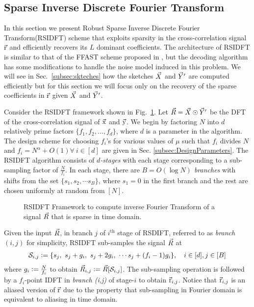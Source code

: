 \subsection{Sparse Inverse Discrete Fourier Transform}
\label{subsec:RSIDFT}	
 In this section we present Robust Sparse Inverse Discrete Fourier Transform(RSIDFT) scheme that exploits sparsity in the cross-correlation signal $\vec{\mathrm{r}}$ and efficiently recovers its $L$ dominant coefficients. The architecture of RSIDFT is similar to that of the FFAST scheme proposed in \cite{pawar2014robust}, but the decoding algorithm has some modifications to handle the noise model induced in this problem. We will see in Sec.~\ref{subsec:skteches} how the sketches $\vec{X}$ and $\vec{Y}'$ are computed efficiently but for this section we will focus only on the recovery of the sparse coefficients in $\vec{\mathrm{r}}$ given $\vec{X}$ and $\vec{Y}'$.
	  	
Consider the RSIDFT framework shown in Fig.~\ref{fig:rsidft}. Let $ \vec{R} =\vec{X} \odot \vec{Y}'$ be the DFT of the cross-correlation signal of $\vec{\mathrm{x}}$ and $\vec{\mathrm{y}}$. We begin by factoring $N$ into $d$ relatively prime factors $\{f_1,f_2,\ldots,f_d\}$, where $d$ is a parameter in the algorithm. The design scheme for choosing $f_i$'s for various values of $\mu$ such that $f_i$ divides $N$ and $f_i=N^{\alpha}+O(1) \forall ~i\in[d]$ are given in Sec. \ref{subsec:DesignParameters}. The RSIDFT algorithm consists of {\it $d$-stages} with each stage corresponding to a sub-sampling factor of $\frac{N}{f_i}$. In each stage, there are {\it $B= O(\log N)$ branches} with shifts from the set $ \{s_1, s_2, \cdots s_B\} $, where $s_1 =0$ in the first branch and the rest are chosen uniformly at random from $[N]$.
	   	 	
\begin{figure}[h!]
	\begin{center}
	 	\resizebox{0.43\textwidth}{!}{}
	\end{center}	
\caption{ RSIDFT Framework to compute inverse Fourier Transform of a signal $\vec{R}$ that is sparse in time domain. }\label{fig:rsidft}
\end{figure}

	 Given the input $\vec{R}$, in branch $j$ of $i^{\text{th}}$ stage of RSDIFT, referred to as \textit{branch $(i,j)$} for simplicity, RSIDFT sub-samples the signal $\vec{R}$ at
\begin{align}
\label{Eqn:SamplingSets}
	 \mathcal{S}_{i,j} \mathrel{\mathop:}= \{s_j,\ s_j + g_i,\ s_j + 2g_i,\ \cdots s_j + (f_i-1) g_i\}, \quad i\in[d], j\in[B]
\end{align}
where $g_i\mathrel{\mathop:}= \frac{N}{f_i}$ to obtain $\vec{R}_{i,j}\mathrel{\mathop:}=\vec{R}[\mathcal{S}_{i,j}]$. The sub-sampling operation is followed by a $f_i$-point IDFT in \textit{branch (i,j)} of stage-$i$ to obtain $ \vec{\mathrm{r}}_{i,j}$. Notice that $ \vec{\mathrm{r}}_{i,j}$ is an aliased version of $\vec{\mathrm{r}}$ due to the property that sub-sampling in Fourier domain is equivalent to aliasing in time domain.

